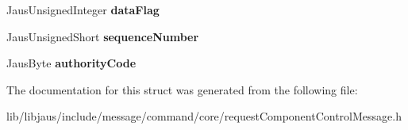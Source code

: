 \begin{DoxyCompactItemize}
\item 
\hypertarget{struct_request_component_control_message_struct_a6da3c693f6bff31ef16ed9415a342da1}{\-Jaus\-Unsigned\-Integer {\bfseries data\-Flag}}\label{struct_request_component_control_message_struct_a6da3c693f6bff31ef16ed9415a342da1}

\item 
\hypertarget{struct_request_component_control_message_struct_af8ad803e4e58925ab41df9c27c0e8a65}{\-Jaus\-Unsigned\-Short {\bfseries sequence\-Number}}\label{struct_request_component_control_message_struct_af8ad803e4e58925ab41df9c27c0e8a65}

\item 
\hypertarget{struct_request_component_control_message_struct_aedb4e26e1fa7762734fb96c3495975bc}{\-Jaus\-Byte {\bfseries authority\-Code}}\label{struct_request_component_control_message_struct_aedb4e26e1fa7762734fb96c3495975bc}

\end{DoxyCompactItemize}


\-The documentation for this struct was generated from the following file\-:\begin{DoxyCompactItemize}
\item 
lib/libjaus/include/message/command/core/request\-Component\-Control\-Message.\-h\end{DoxyCompactItemize}
